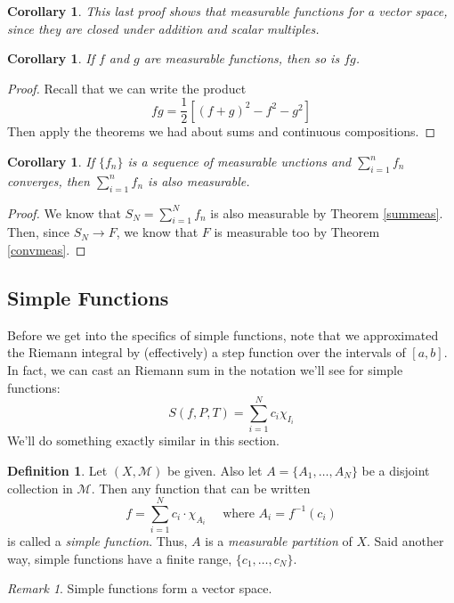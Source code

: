 \documentclass[12pt]{article}
\theoremstyle{plain}
\newtheorem{cor}[thm]{Corollary}
\theoremstyle{definition}
\newtheorem{defn}[thm]{Definition}
\theoremstyle{remark}
\newtheorem*{rmk}{Remark}
\begin{document}
\begin{cor}
This last proof shows that measurable functions for a \emph{vector space}, since they are closed under addition and scalar multiples.
\end{cor}

\begin{cor}
If $f$ and $g$ are measurable functions, then so is $fg$.
\end{cor}
\begin{proof}
Recall that we can write the product
\[ 
    fg = \frac{1}{2}\left[(f+g)^2 - f^2 - g^2\right]
\]
Then apply the theorems we had about sums and continuous compositions.
\end{proof}

\begin{cor}
If $\{f_n\}$ is a sequence of measurable unctions and $\sum^n_{i=1} f_n$ converges, then $\sum^n_{i=1} f_n$ is also measurable. 
\end{cor}
\begin{proof}
We know that $S_N = \sum^N_{i=1} f_n$ is also measurable by Theorem \ref{summeas}. Then, since $S_N\rightarrow F$, we know that $F$ is measurable too by Theorem \ref{convmeas}.
\end{proof}

\subsection{Simple Functions}

Before we get into the specifics of simple functions, note that we approximated the Riemann integral by (effectively) a step function over the intervals of $[a,b]$. In fact, we can cast an Riemann sum in the notation we'll see for simple functions:
    \[ S(f,P,T) = \sum^N_{i=1} c_i \chi_{I_i} \]
We'll do something exactly similar in this section.

\begin{defn}
Let $(X,\mathscr{M})$ be given. Also let $A=\{A_1, \ldots, A_N\}$ be a disjoint collection in $\mathscr{M}$. Then any function that can be written 
\[ 
    f = \sum^N_{i=1} c_i \cdot \chi_{A_i} \quad
    \text{ where } A_i = f^{-1}(c_i)
\]
is called a \emph{simple function}. Thus, $A$ is a \emph{measurable partition} of $X$. Said another way, simple functions have a finite range, $\{c_1, \ldots, c_N\}$.
\end{defn}

\begin{rmk} Simple functions form a vector space.
\end{rmk}
\end{document}

